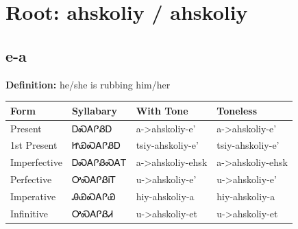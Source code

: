 \documentclass{article}%
\begin{document}
%
\normalsize%
\section*{Root: ahskoliy / ahskoliy}%
\subsection*{e-a}%
\textbf{Definition: }%
he/she is rubbing him/her%
\\[0.5em]%
\begin{tabular}{|l|l|l|l|}%
\hline%
\textbf{Form}&\textbf{Syllabary}&\textbf{With Tone}&\textbf{Toneless}\\%
\hline%
Present&ᎠᏍᎪᎵᏰᎠ&a{-}>ahskoliy{-}e'&a{-}>ahskoliy{-}e'\\%
1st Present&ᏥᏯᏍᎪᎵᏰᎠ&tsiy{-}ahskoliy{-}e'&tsiy{-}ahskoliy{-}e'\\%
Imperfective&ᎠᏍᎪᎵᏰᏍᎪᎢ&a{-}>ahskoliy{-}ehsk&a{-}>ahskoliy{-}ehsk\\%
Perfective&ᎤᏍᎪᎵᏰᎥᎢ&u{-}>ahskoliy{-}e'&u{-}>ahskoliy{-}e'\\%
Imperative&ᎯᏯᏍᎪᎵᏯ&hiy{-}ahskoliy{-}a&hiy{-}ahskoliy{-}a\\%
Infinitive&ᎤᏍᎪᎵᏰᏗ&u{-}>ahskoliy{-}et&u{-}>ahskoliy{-}et\\%
\hline%
\end{tabular}%
\\[1em]%
\end{document}
